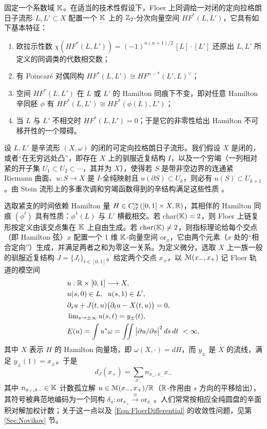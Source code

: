 固定一个系数域 $\mathbb{K}$。在适当的技术性假设下，Floer 上同调给一对闭的定向拉格朗日子流形 $L, L' \subset X$ 配置一个 $\mathbb{K}$ 上的 $\mathbb{Z}_2$-分次向量空间 $HF^*(L,L')$，它具有如下基本特征：
\begin{enumerate}
\item 欧拉示性数 $\chi(HF^*(L,L')) = (-1)^{n(n+1)/2}\, [L]\cdot[L']$ 还原出 $L, L'$ 所定义的同调类的代数相交数；
\item 有 Poincar\'e 对偶同构 $HF^*(L,L') \cong HF^{n-*}(L',L)^{\vee}$；
\item 空间 $HF^*(L,L')$ 在 $L$ 或 $L'$ 的 Hamilton 同痕下不变，即对任意 Hamilton 辛同胚 $\phi$ 有 $HF^*(L,L') \cong HF^*(\phi(L), L')$；
\item 当 $L$ 与 $L'$ 不相交时 $HF^*(L, L') = 0$；于是它的非零性给出 Hamilton 不可移开性的一个障碍。
\end{enumerate}

设 $L, L'$ 是辛流形 $(X,\omega)$ 的闭的可定向拉格朗日子流形。我们假设 $X$ 是闭的，或者“在无穷远处凸”，即存在 $X$ 上的驯服近复结构 $I$，以及一个穷竭（一列相对紧的开子集 $U_1 \subset U_2 \subset \cdots$，其并为 $X$），使得若 $S$ 是带非空边界的连通紧 Riemann 曲面、$u: S \rightarrow X$ 是 $I$-全纯映射且 $u(\partial S) \subset U_k$，则必有 $u(S) \subset U_{k+1}$。由 Stein 流形上的多重次调和穷竭函数得到的辛结构满足这些性质 \cite{CieliebakEliashberg}。

选取紧支的时间依赖 Hamilton 量 $H \in C^\infty_{ct}([0,1] \times X,\mathbb{R})$，其相伴的 Hamilton 同痕 $(\phi^t)$ 具有性质：$\phi^1(L)$ 与 $L'$ 横截相交。若 char$(\mathbb{K}) = 2$，则 Floer 上链复形按定义由该交点集在 $\mathbb{K}$ 上自由生成。若 $\textrm{char}(\mathbb{K})\neq 2$，则指标理论给每个交点（即 Hamilton 弦）$x$ 配置一个 1 维 $\mathbb{K}$-向量空间 $\mathrm{or}_x$，它由两个元素（$x$ 处的“相合定向”）生成，并满足两者之和为零这一关系。为定义微分，选取 $X$ 上一族一般的驯服近复结构 $J=\{J_t\}_{t\in[0,1]}$。给定两个交点 $x_\pm$，以 $\EuScript{M}(x_-,x_+)$ 记 Floer 轨道的模空间
\begin{equation} \label{eq:Floer}
\begin{aligned}
 & u: \mathbb{R} \times [0,1] \longrightarrow X, \\
 & u(s,0) \in L, \;\; u(s,1) \in L', \\
 & \partial_s u + J(t,u) \big(\partial_tu - X(t,u)\big) = 0, \\
 & \textstyle\lim_{s \rightarrow \pm\infty} u(s,t) = y_\pm(t), \\
 & E(u) = \int u^*\omega = \int \!\!\! \int \big| \partial u / \partial s \big|^2 \, ds\,dt \ < \infty,
\end{aligned}
\end{equation}
其中 $X$ 表示 $H$ 的 Hamilton 向量场，即 $\omega(X,\cdot) = dH$，而 $y_\pm$ 是 $X$ 的流线，满足 $y_\pm(1) = x_\pm$。于是
\begin{equation} \label{Eqn:FloerDifferential}
d_J(x_+) = \sum_{x_-} n_{x_+, x_-} x_-
\end{equation} 其中 $n_{x_+, x_-} \in \mathbb{K}$ 计数孤立解 $u \in \EuScript{M}(x_-, x_+) / \mathbb{R}$（$\mathbb{R}$-作用由 $s$ 方向的平移给出），其符号被典范地编码为一个同构 $\delta_u: \mathrm{or}_{x_+} \stackrel{\cong}{\longrightarrow} \mathrm{or}_{x_-}$。人们常常按相应全纯圆盘的辛面积对解加权计数；关于这一点以及 \eqref{Eqn:FloerDifferential} 的收敛性问题，见第 \ref{Sec:Novikov} 节。

